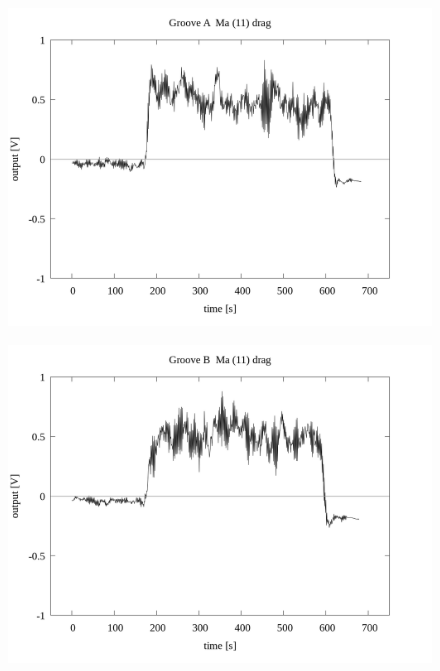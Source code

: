 \documentclass[a4paper]{jsarticle}
\begin{document}
\begin{figure}[htbp]
    \footnotesize
    \begin{center}
        \includegraphics[width=140mm]{../../../33_result/210806/moving_average/11/drag/01/Groove_A_ma(11)_drag_01.png}
    \end{center}
\end{figure}

\begin{figure}[htbp]
    \footnotesize
    \begin{center}
        \includegraphics[width=140mm]{../../../33_result/210806/moving_average/11/drag/01/Groove_B_ma(11)_drag_01.png}
    \end{center}
\end{figure}
\end{document}
